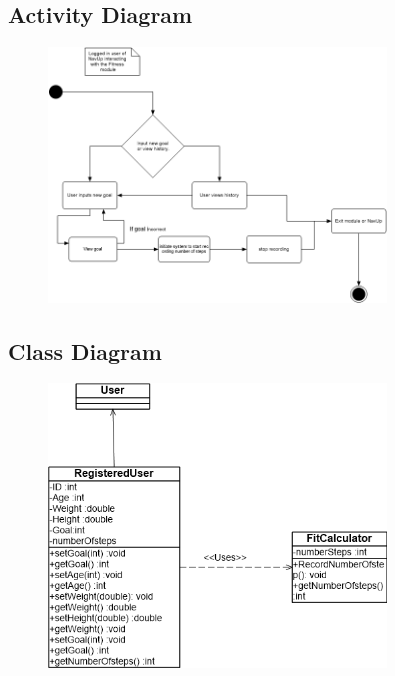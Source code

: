 \subsection{Activity Diagram}
\begin{figure}[!htbp]
  \includegraphics[width=0.8\textwidth]{Fitness/FitnessActivitydiagram.png}
\end{figure}

\subsection{Class Diagram}
\begin{figure}[!htbp]
  \includegraphics[width=0.8\textwidth]{Fitness/FitnessClassDgm.png}
\end{figure}
